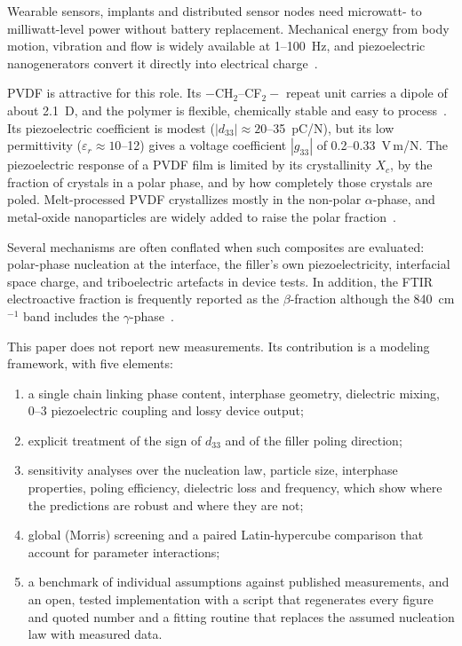 \documentclass[11pt,a4paper]{article}
\newcommand{\dt}{d_{33}}
\begin{document}
Wearable sensors, implants and distributed sensor nodes need microwatt- to milliwatt-level power without battery replacement. Mechanical energy from body motion, vibration and flow is widely available at 1--100~Hz, and piezoelectric nanogenerators convert it directly into electrical charge~\cite{Wang2006}.

PVDF is attractive for this role. Its $-$CH$_2$--CF$_2-$ repeat unit carries a dipole of about 2.1~D, and the polymer is flexible, chemically stable and easy to process~\cite{Lovinger1983,Martins2014}. Its piezoelectric coefficient is modest ($|\dt|\approx20$--35~pC/N), but its low permittivity ($\varepsilon_r\approx10$--12) gives a voltage coefficient $|g_{33}|$ of 0.2--0.33~V\,m/N. The piezoelectric response of a PVDF film is limited by its crystallinity $X_c$, by the fraction of crystals in a polar phase, and by how completely those crystals are poled. Melt-processed PVDF crystallizes mostly in the non-polar $\alpha$-phase, and metal-oxide nanoparticles are widely added to raise the polar fraction~\cite{Martins2014}.

Several mechanisms are often conflated when such composites are evaluated: polar-phase nucleation at the interface, the filler's own piezoelectricity, interfacial space charge, and triboelectric artefacts in device tests. In addition, the FTIR electroactive fraction is frequently reported as the $\beta$-fraction although the 840~cm$^{-1}$ band includes the $\gamma$-phase~\cite{Cai2017}.

This paper does not report new measurements. Its contribution is a modeling framework, with five elements:
\begin{enumerate}
\item a single chain linking phase content, interphase geometry, dielectric mixing, 0--3 piezoelectric coupling and lossy device output;
\item explicit treatment of the sign of $\dt$ and of the filler poling direction;
\item sensitivity analyses over the nucleation law, particle size, interphase properties, poling efficiency, dielectric loss and frequency, which show where the predictions are robust and where they are not;
\item global (Morris) screening and a paired Latin-hypercube comparison that account for parameter interactions;
\item a benchmark of individual assumptions against published measurements, and an open, tested implementation with a script that regenerates every figure and quoted number and a fitting routine that replaces the assumed nucleation law with measured data.
\end{enumerate}
\end{document}
